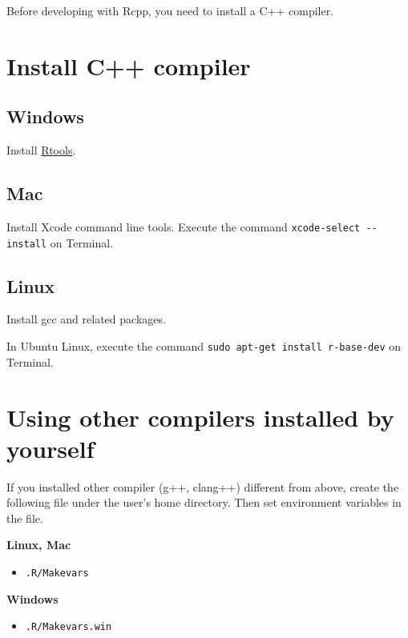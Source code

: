 \documentclass[
]{book}
\providecommand{\tightlist}{%
  \setlength{\itemsep}{0pt}\setlength{\parskip}{0pt}}
\begin{document}
Before developing with Rcpp, you need to install a C++ compiler.

\hypertarget{install-c-compiler}{%
\section{Install C++ compiler}\label{install-c-compiler}}

\hypertarget{windows}{%
\subsection{Windows}\label{windows}}

Install \href{https://cran.r-project.org/bin/windows/Rtools/index.html}{Rtools}.

\hypertarget{mac}{%
\subsection{Mac}\label{mac}}

Install Xcode command line tools. Execute the command \texttt{xcode-select\ -\/-install} on Terminal.

\hypertarget{linux}{%
\subsection{Linux}\label{linux}}

Install gcc and related packages.

In Ubuntu Linux, execute the command \texttt{sudo\ apt-get\ install\ r-base-dev} on Terminal.

\hypertarget{using-other-compilers-installed-by-yourself}{%
\section{Using other compilers installed by yourself}\label{using-other-compilers-installed-by-yourself}}

If you installed other compiler (g++, clang++) different from above, create the following file under the user's home directory. Then set environment variables in the file.

\textbf{Linux, Mac}

\begin{itemize}
\tightlist
\item
  \texttt{.R/Makevars}
\end{itemize}

\textbf{Windows}

\begin{itemize}
\tightlist
\item
  \texttt{.R/Makevars.win}
\end{itemize}
\end{document}
